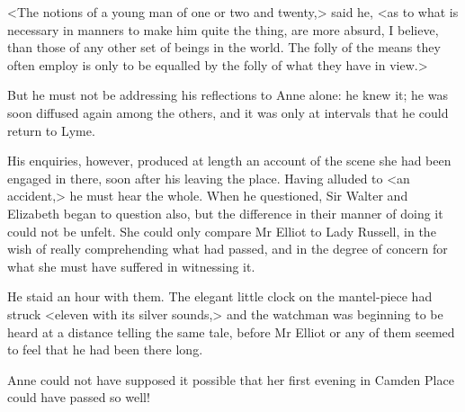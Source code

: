 <The notions of a young man of one or two and twenty,> said he, <as to what is necessary in manners to make him quite the thing, are more absurd, I believe, than those of any other set of beings in the world. The folly of the means they often employ is only to be equalled by the folly of what they have in view.>

But he must not be addressing his reflections to Anne alone: he knew it; he was soon diffused again among the others, and it was only at intervals that he could return to Lyme.

His enquiries, however, produced at length an account of the scene she had been engaged in there, soon after his leaving the place. Having alluded to <an accident,> he must hear the whole. When he questioned, Sir Walter and Elizabeth began to question also, but the difference in their manner of doing it could not be unfelt. She could only compare Mr Elliot to Lady Russell, in the wish of really comprehending what had passed, and in the degree of concern for what she must have suffered in witnessing it.

He staid an hour with them. The elegant little clock on the mantel-piece had struck <eleven with its silver sounds,> and the watchman was beginning to be heard at a distance telling the same tale, before Mr Elliot or any of them seemed to feel that he had been there long.

Anne could not have supposed it possible that her first evening in Camden Place could have passed so well!